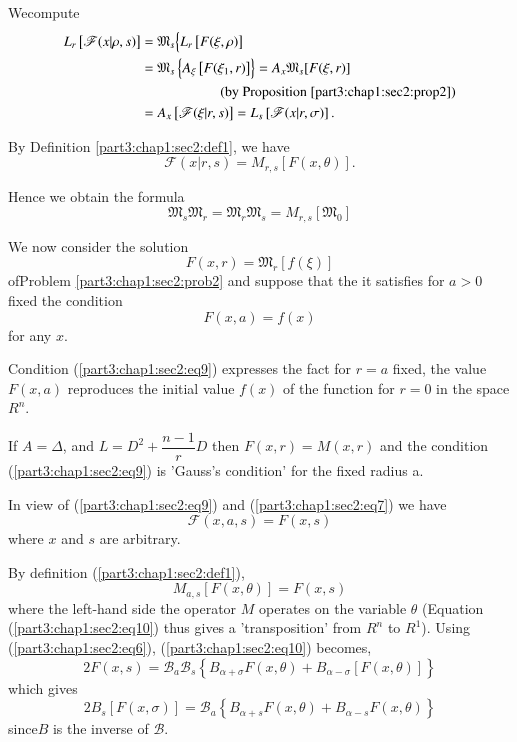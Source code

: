 We\pageoriginale compute
\begin{align*}
  L_r \left[\mathscr{F}(x| \rho, s) \right] &= \mathfrak{M}_s \Big\{ L_r
  \left[F (\xi, \rho) \right] \\
  & = \mathfrak{M}_s \left\{A_\xi \left[F(\xi_1, r) \right] \right\} =
  A_x \mathfrak{M}_s [F(\xi, r) ] \\ 
  & \hspace{2cm}\text{(by Proposition \ref{part3:chap1:sec2:prop2})} \\
  & = A_x \left[\mathscr{F}(\xi | r, s) \right] = L_s
  \left[\mathscr{F}(x | r, \sigma ) \right]. 
\end{align*}

By Definition \ref{part3:chap1:sec2:def1}, we have
$$
\mathscr{F} (x| r, s) = M_{r, s} [F(x, \theta)].
$$

Hence we obtain the formula 
\begin{equation*}
  \mathfrak{M}_s \mathfrak{M}_r = \mathfrak{M}_r \mathfrak{M}_s  =
  M_{r, s}[\mathfrak{M}_0] \tag{8}\label{part3:chap1:sec2:eq8}   
\end{equation*}

We now consider the solution
$$
F(x, r) = \mathfrak{M}_r [f(\xi)]
$$
of\pageoriginale Problem \ref{part3:chap1:sec2:prob2} and suppose that
the it satisfies for $a > 0$ fixed the condition 
\begin{equation*}
  F(x, a) = f(x) \tag{9}\label{part3:chap1:sec2:eq9}
\end{equation*}
for any $x$.

Condition (\ref{part3:chap1:sec2:eq9}) expresses the fact for $r = a$ fixed, the value $F(x,
a)$ reproduces the initial value $f(x)$ of the function for $r = 0$ in
the space $R^n$. 

\begin{remark*}
  If $A = \Delta$, and $L=D^2 + \dfrac{n-1}{r}D$ then $F(x, r) = M(x,
  r)$ and the condition (\ref{part3:chap1:sec2:eq9}) is 'Gauss's
  condition' for the fixed radius a. 
\end{remark*}

In view of (\ref{part3:chap1:sec2:eq9}) and (\ref{part3:chap1:sec2:eq7}) we have
$$
\mathscr{F} (x, a, s) = F(x, s)
$$
where $x$ and $s$ are arbitrary.

By definition (\ref{part3:chap1:sec2:def1}), 
\begin{equation*}
  M_{a, s} [F(x, \theta )] = F(x, s) \tag{10}\label{part3:chap1:sec2:eq10}
\end{equation*}
where the left-hand side the operator $M$ operates on the variable
$\theta$ (Equation (\ref{part3:chap1:sec2:eq10}) thus gives a
'transposition' from $R^n$ to 
$R^1$). Using (\ref{part3:chap1:sec2:eq6}),
(\ref{part3:chap1:sec2:eq10}) becomes,   
$$
2F(x, s) = \mathscr{B}_a \mathscr{B}_s \left\{B_{\alpha+ \sigma}F(x,
\theta) + B_{\alpha - \sigma} [F(x, \theta)]\right\} 
$$
which gives 
$$
2 B_s [F(x, \sigma)] = \mathscr{B}_a \left\{B_{\alpha+ s}F(x, \theta)
+ B_{\alpha - s} F(x, \theta)\right\} 
$$
since\pageoriginale $B$ is the inverse of $\mathscr{B}$.

